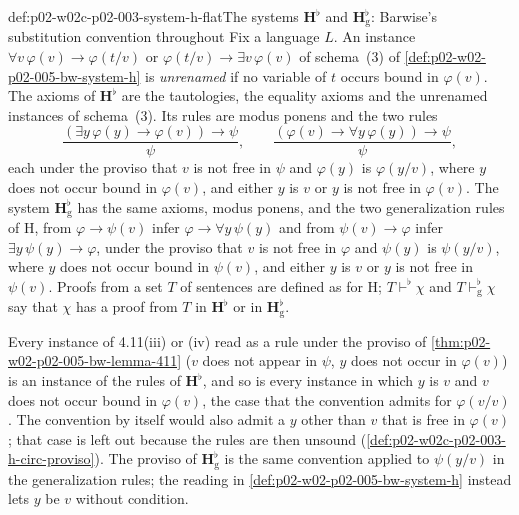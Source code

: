 \begin{hbdefinition}{def:p02-w02c-p02-003-system-h-flat}{The systems \(\mathbf H^{\flat}\) and \(\mathbf H^{\flat}_{\mathrm g}\): Barwise's substitution convention throughout}
Fix a language \(L\).  An instance \(\forall v\,\varphi(v)\to\varphi(t/v)\)
or \(\varphi(t/v)\to\exists v\,\varphi(v)\) of schema~(3) of
\cref{def:p02-w02-p02-005-bw-system-h} is \emph{unrenamed} if no variable
of \(t\) occurs bound in \(\varphi(v)\).  The axioms of
\(\mathbf H^{\flat}\) are the tautologies, the equality axioms and the
unrenamed instances of schema~(3).  Its rules are modus ponens and the two
rules
\[
\frac{(\exists y\,\varphi(y)\to\varphi(v))\to\psi}{\psi},\qquad
\frac{(\varphi(v)\to\forall y\,\varphi(y))\to\psi}{\psi},
\]
each under the proviso that \(v\) is not free in \(\psi\) and
\(\varphi(y)\) is \(\varphi(y/v)\), where \(y\) does not occur bound in
\(\varphi(v)\), and either \(y\) is \(v\) or \(y\) is not free in
\(\varphi(v)\).  The system \(\mathbf H^{\flat}_{\mathrm g}\) has the same
axioms, modus ponens, and the two generalization rules of H, from
\(\varphi\to\psi(v)\) infer \(\varphi\to\forall y\,\psi(y)\) and from
\(\psi(v)\to\varphi\) infer \(\exists y\,\psi(y)\to\varphi\), under the
proviso that \(v\) is not free in \(\varphi\) and \(\psi(y)\) is
\(\psi(y/v)\), where \(y\) does not occur bound in \(\psi(v)\), and either
\(y\) is \(v\) or \(y\) is not free in \(\psi(v)\).  Proofs from a set
\(T\) of sentences are defined as for H; \(T\vdash^{\flat}\chi\) and
\(T\vdash^{\flat}_{\mathrm g}\chi\) say that \(\chi\) has a proof from \(T\)
in \(\mathbf H^{\flat}\) or in \(\mathbf H^{\flat}_{\mathrm g}\).
\end{hbdefinition}

Every instance of 4.11(iii) or (iv) read as a rule under the proviso of
\cref{thm:p02-w02-p02-005-bw-lemma-411} (\(v\) does not appear in
\(\psi\), \(y\) does not occur in \(\varphi(v)\)) is an instance of the
rules of \(\mathbf H^{\flat}\), and so is every instance in which \(y\) is
\(v\) and \(v\) does not occur bound in \(\varphi(v)\), the case that the
convention admits for \(\varphi(v/v)\).  The convention by itself would
also admit a \(y\) other than \(v\) that is free in \(\varphi(v)\); that
case is left out because the rules are then unsound
(\cref{def:p02-w02c-p02-003-h-circ-proviso}).  The proviso of
\(\mathbf H^{\flat}_{\mathrm g}\) is the same convention applied to
\(\psi(y/v)\) in the generalization rules; the reading in
\cref{def:p02-w02-p02-005-bw-system-h} instead lets \(y\) be \(v\) without
condition.

